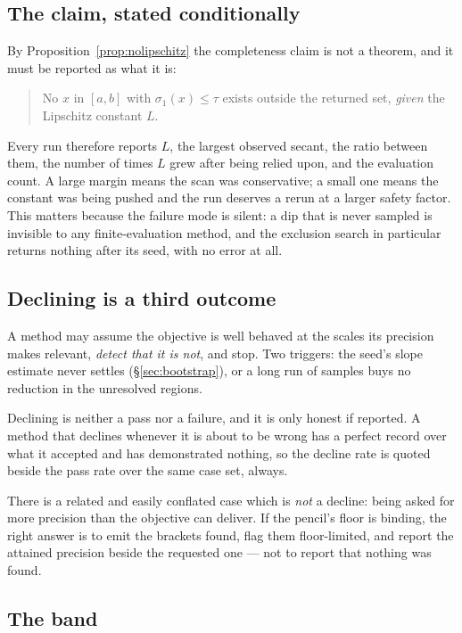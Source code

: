 \documentclass[11pt]{article}
\theoremstyle{definition}
\theoremstyle{remark}
\newcommand{\sig}{\sigma}
\begin{document}
\subsection{The claim, stated conditionally}

By Proposition~\ref{prop:nolipschitz} the completeness claim is not a theorem, and it must be
reported as what it is:

\begin{quote}
No $x$ in $[a,b]$ with $\sig_1(x)\le\tau$ exists outside the returned set, \emph{given} the
Lipschitz constant $L$.
\end{quote}

Every run therefore reports $L$, the largest observed secant, the ratio between them, the
number of times $L$ grew after being relied upon, and the evaluation count. A large margin
means the scan was conservative; a small one means the constant was being pushed and the run
deserves a rerun at a larger safety factor. This matters because the failure mode is silent: a
dip that is never sampled is invisible to any finite-evaluation method, and the exclusion
search in particular returns nothing after its seed, with no error at all.

\subsection{Declining is a third outcome}
\label{sec:decline}

A method may assume the objective is well behaved at the scales its precision makes relevant,
\emph{detect that it is not}, and stop. Two triggers: the seed's slope estimate never settles
(\S\ref{sec:bootstrap}), or a long run of samples buys no reduction in the unresolved regions.

Declining is neither a pass nor a failure, and it is only honest if reported. A method that
declines whenever it is about to be wrong has a perfect record over what it accepted and has
demonstrated nothing, so the decline rate is quoted beside the pass rate over the same case set,
always.

There is a related and easily conflated case which is \emph{not} a decline: being asked for
more precision than the objective can deliver. If the pencil's floor is binding, the right
answer is to emit the brackets found, flag them floor-limited, and report the attained
precision beside the requested one --- not to report that nothing was found.

\subsection{The band}
\end{document}
